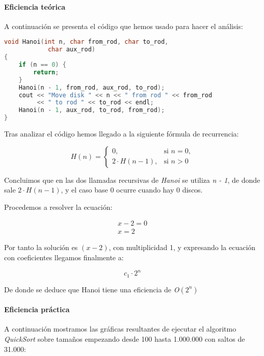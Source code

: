 \documentclass[a4paper,12pt]{article} %
\begin{document}
\paragraph{Eficiencia teórica}

A continuación se presenta el código que hemos usado para hacer el análisis:

\begin{lstlisting}[language=C, caption={Código de Hanoi}]
void Hanoi(int n, char from_rod, char to_rod,
            char aux_rod)
{
    if (n == 0) {
        return;
    }
    Hanoi(n - 1, from_rod, aux_rod, to_rod);
    cout << "Move disk " << n << " from rod " << from_rod
         << " to rod " << to_rod << endl;
    Hanoi(n - 1, aux_rod, to_rod, from_rod);
}
\end{lstlisting}

Tras analizar el código hemos llegado a la siguiente fórmula de recurrencia:

\[
H(n)=
\begin{cases}
0,  & \text{si } n = 0,\\[6pt]
2\cdot H(n-1), & \text{si } n > 0
\end{cases}
\]

Concluimos que en las dos llamadas recursivas de \textit{Hanoi}
se utiliza \textit{n - 1}, de donde sale $2\cdot H(n-1)$, y el caso base 
0 ocurre cuando hay 0 discos.

Procedemos a resolver la ecuación:

\begin{align*}
	x - 2 = 0 \\
	x = 2
\end{align*}

Por tanto la solución es $(x -2)$, con multiplicidad 1, y expresando la 
ecuación con coeficientes llegamos finalmente a:

\begin{equation*}
	c_{1}\cdot 2^{n}
\end{equation*}

De donde se deduce que Hanoi tiene una eficiencia de \textit{O}$(2^{n})$

\paragraph{Eficiencia práctica}

A continuación mostramos las gráficas resultantes de ejecutar el algoritmo \textit{QuickSort} 
sobre tamaños empezando desde 100 hasta 1.000.000 con saltos de 31.000:
\end{document}
